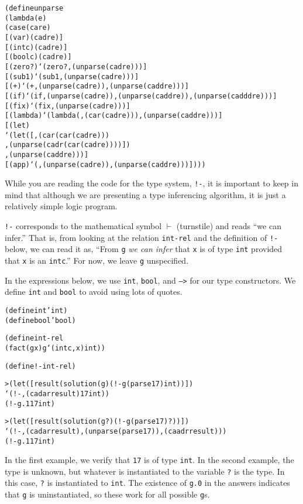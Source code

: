 \begin{alltt}
(define unparse
  (lambda (e)
    (case (car e)
      [(var) (cadr e)]
      [(intc) (cadr e)]
      [(boolc) (cadr e)]
      [(zero?) `(zero? ,(unparse (cadr e)))]
      [(sub1) `(sub1 ,(unparse (cadr e)))]
      [(+) `(+ ,(unparse (cadr e)) ,(unparse (caddr e)))]
      [(if) `(if ,(unparse (cadr e)) ,(unparse (caddr e)) ,(unparse (cadddr e)))]
      [(fix) `(fix ,(unparse (cadr e)))]
      [(lambda) `(lambda (,(car (cadr e))) ,(unparse (caddr e)))]
      [(let)
       `(let ([,(car (car (cadr e)))
               ,(unparse (cadr (car (cadr e))))])
          ,(unparse (caddr e)))]
      [(app) `(,(unparse (cadr e)) ,(unparse (caddr e)))])))
\end{alltt}

While you are reading the code for the type system, \texttt{!-}, it is
important to keep in mind that although we are presenting a type
inferencing algorithm, it is just a relatively simple logic program.

\texttt{!-} corresponds to the mathematical symbol $\vdash$
(turnstile) and reads ``we can infer.''  That is, from looking at the
relation \texttt{int-rel} and the definition of \texttt{!-} below, we
can read it as, ``From \texttt{g} \emph{we can infer} that \texttt{x}
is of type \texttt{int} provided that \texttt{x} is an \texttt{intc}.''
For now, we leave \texttt{g} unspecified.

In the expressions below, we use \texttt{int}, \texttt{bool}, and
\texttt{-->} for our type constructors.  We define \texttt{int}
and \texttt{bool} to avoid using lots of quotes.

\begin{alltt}
(define int 'int)
(define bool 'bool)
\end{alltt}

\begin{alltt}
(define int-rel
  (fact (g x) g `(intc ,x) int))

(define !- int-rel)
\end{alltt}

\begin{alltt}
> (let ([result (solution (g) (!- g (parse 17) int))])
    `(!- ,(cadar result) 17 int))
(!- g.1 17 int)

> (let ([result (solution (g ?) (!- g (parse 17) ?))])
    `(!- ,(cadar result) ,(unparse (parse 17)) ,(caadr result)))
(!- g.1 17 int)
\end{alltt}

In the first example, we verify that \texttt{17} is of type
\texttt{int}.  In the second example, the type is unknown, but
whatever is instantiated to the variable \texttt{?} is the
type.  In this case, \texttt{?} is instantiated to \texttt{int}.
The existence of \texttt{g.0} in the answers indicates that \texttt{g}
is uninstantiated, so these work for all possible \texttt{g}s.


